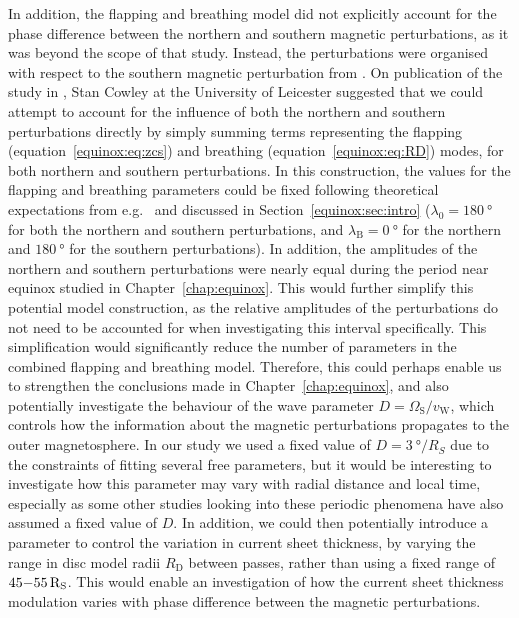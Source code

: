 In addition, the flapping and breathing model did not explicitly account for the phase difference between the northern and southern magnetic perturbations, as it was beyond the scope of that study. Instead, the perturbations were organised with respect to the southern magnetic perturbation from \citet{andrews2012}. On publication of the study in \citet{sorba2018}, Stan Cowley at the University of Leicester suggested that we could attempt to account for the influence of both the northern and southern perturbations directly by simply summing terms representing the flapping (equation~\ref{equinox:eq:zcs}) and breathing (equation~\ref{equinox:eq:RD}) modes, for both northern and southern perturbations. In this construction, the values for the flapping and breathing parameters could be fixed following theoretical expectations from e.g.\ \citet{cowley2017a} and discussed in Section~\ref{equinox:sec:intro} ($\lambda_0 = \SI{180}{\degree}$ for both the northern and southern perturbations, and $\lambda_\mathrm{B}=\SI{0}{\degree}$ for the northern and $\SI{180}{\degree}$ for the southern perturbations). In addition, the amplitudes of the northern and southern perturbations were nearly equal during the period near equinox studied in Chapter~\ref{chap:equinox}. This would further simplify this potential model construction, as the relative amplitudes of the perturbations do not need to be accounted for when investigating this interval specifically. This simplification would significantly reduce the number of parameters in the combined flapping and breathing model. Therefore, this could perhaps enable us to strengthen the conclusions made in Chapter~\ref{chap:equinox}, and also potentially investigate the behaviour of the wave parameter $D=\Omega_\mathrm{S}/v_\mathrm{W}$, which controls how the information about the magnetic perturbations propagates to the outer magnetosphere. In our study we used a fixed value of $D=\SI{3}{\degree \per R_S}$ due to the constraints of fitting several free parameters, but it would be interesting to investigate how this parameter may vary with radial distance and local time, especially as some other studies looking into these periodic phenomena have also assumed a fixed value of $D$. In addition, we could then potentially introduce a parameter to control the variation in current sheet thickness, by varying the range in disc model radii $R_\mathrm{D}$ between passes, rather than using a fixed range of $45{\--}\SI{55}{R_S}$. This would enable an investigation of how the current sheet thickness modulation varies with phase difference between the magnetic perturbations.


